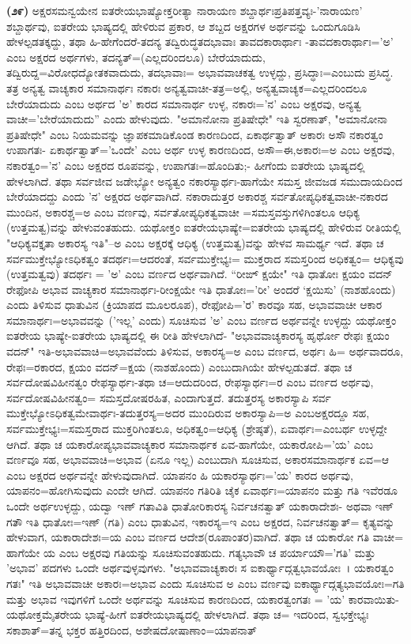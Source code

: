 \textbf{(೨೯)} ಅಕ್ಷರಸಮನ್ವಯೇನ ಐತರೇಯಭಾಷ್ಯೋಕ್ತರೀತ್ಯಾ ನಾರಾಯಣ ಶಬ್ದಾರ್ಥಃ\break ಪ್ರತಿಪತ್ತವ್ಯಃ-'ನಾರಾಯಣ' ಶಬ್ದಾರ್ಥವು, ಐತರೇಯ ಭಾಷ್ಯದಲ್ಲಿ ಹೇಳಿರುವ ಪ್ರಕಾರ, ಆ ಶಬ್ದದ ಅಕ್ಷರಗಳ ಅರ್ಥವನ್ನು ಒಂದುಗೂಡಿಸಿ ಹೇಳಲ್ಪಡತಕ್ಕದ್ದು, ತಥಾ ಹಿ-ಹೇಗೆಂದರೆ-\-ತದನ್ಯ ತದ್ವಿರುದ್ಧತದಭಾವಾಃ ತಾವದಕಾರಾರ್ಥಾಃ -ತಾವದಕಾರಾರ್ಥಾಃ='ಅ' ಎಂಬ ಅಕ್ಷರದ ಅರ್ಥಗಳು, ತದನ್ಯತ್=(ಎಲ್ಲದರಿಂದಲೂ) ಬೇರೆಯಾದುದು, ತದ್ವಿರುದ್ದ=ವಿರೋಧ\-ದ್ಯೋತಕ\-ವಾದುದು, ತದಭಾವಾಃ= ಅಭಾವವಾಚಕತ್ವ ಉಳ್ಳದ್ದು, ಪ್ರಸಿದ್ಧಾಃ=ಎಂಬುದು ಪ್ರಸಿದ್ಧ. ತತ್ರ ಅನ್ಯತ್ವ ವಾಚ್ಯಕಾರ ಸಮಾನಾರ್ಥಃ ನಕಾರಃ ಅನ್ಯತ್ವವಾಚೀ-ತತ್ರ=ಅಲ್ಲಿ, ಅನ್ಯತ್ವ\-ವಾಚ್ಯಕ=\break ಎಲ್ಲದರಿಂದಲೂ ಬೇರೆಯಾದುದು ಎಂಬ ಅರ್ಥದ 'ಅ' ಕಾರದ ಸಮಾನಾರ್ಥ ಉಳ್ಳ, ನಕಾರಃ='ನ' ಎಂಬ ಅಕ್ಷರವು, ಅನ್ಯತ್ವ ವಾಚೀ='ಬೇರೆಯಾದುದು'' ಎಂದು ಹೇಳುವುದು. "ಅಮಾನೋನಾ ಪ್ರತಿಷೇಧೇ" ಇತಿ ಸ್ವರಣಾತ್, "ಅಮಾನೋನಾ ಪ್ರತಿಷೇಧೇ" ಎಂಬ ನಿಯಮವನ್ನು ಜ್ಞಾಪಕಮಾಡಿಕೊಂಡ ಕಾರಣದಿಂದ, ಏಕಾರ್ಥತ್ವಾತ್ ಅಕಾರಃ ಅಸೌ ನಕಾರತ್ವಂ ಉಪಾಗತಃ- ಏಕಾರ್ಥತ್ವಾತ್='ಒಂದೇ' ಎಂಬ ಅರ್ಥ ಉಳ್ಳ ಕಾರಣದಿಂದ, ಅಸೌ=ಈ,\break ಅಕಾರಃ=ಅ ಎಂಬ ಅಕ್ಷರವು, ನಕಾರತ್ವಂ='ನ' ಎಂಬ ಅಕ್ಷರದ ರೂಪವನ್ನು, ಉಪಾಗತಃ=\break ಹೊಂದಿತು;- ಹೀಗೆಂದು ಐತರೇಯ ಭಾಷ್ಯದಲ್ಲಿ ಹೇಳಲಾಗಿದೆ. ತಥಾ ಸರ್ವಜೀವ ಜಡೇಭ್ಯೋ ಅನ್ಯತ್ವಂ ನಕಾರಸ್ಯಾರ್ಥಃ-ಹಾಗೆಯೇ ಸಮಸ್ತ ಜೀವಜಡ ಸಮುದಾಯದಿಂದ ಬೇರೆಯಾದದ್ದು ಎಂದು 'ನ' ಅಕ್ಷರದ ಅರ್ಥವಾಗಿದೆ. ನಕಾರಾದುತ್ತರ ಅಕಾರಶ್ಚ ಸರ್ವತೋಪ್ಯಧಿಕತ್ವವಾಚೀ-ನಕಾರದ ಮುಂದಿನ, ಅಕಾರಶ್ಚ=ಅ ಎಂಬ ವರ್ಣವು, ಸರ್ವತೋಪ್ಯಧಿಕತ್ವವಾಚೀ =ಸಮಸ್ತವಸ್ತುಗಳಿಗಿಂತಲೂ ಆಧಿಕ್ಯ (ಉತ್ತಮತ್ವ)ವನ್ನು ಹೇಳುವಂತಹುದು. ಯಥೋಕ್ತಂ ಐತರೇಯಭಾಷ್ಯೇ=ಐತರೇಯ ಭಾಷ್ಯದಲ್ಲಿ ಹೇಳಿರುವ ರೀತಿಯಲ್ಲಿ "ಆಧಿಕ್ಯವಕ್ತೃತಾ ಅಕಾರಸ್ಯ ಇತಿ"–ಅ ಎಂಬ ಅಕ್ಷರಕ್ಕೆ ಆಧಿಕ್ಯ (ಉತ್ತಮತ್ವ)ವನ್ನು ಹೇಳವ ಸಾಮರ್ಥ್ಯ ಇದೆ. ತಥಾ ಚ ಸರ್ವಮುಕ್ತೇಭ್ಯೋಽಧಿಕತ್ವಂ ತದರ್ಥಃ=ಆದರಂತೆ, ಸರ್ವಮುಕ್ತೇಭ್ಯಃ= ಮುಕ್ತರಾದ ಸಮಸ್ತರಿಂದ ಅಧಿಕತ್ವಂ= ಆಧಿಕ್ಯವು (ಉತ್ತಮತ್ವವು) ತದರ್ಥಃ = 'ಅ' ಎಂಬ ವರ್ಣದ ಅರ್ಥವಾಗಿದೆ. “ರೀಙ್ ಕ್ಷಯೇ" ಇತಿ ಧಾತೋಃ ಕ್ಷಯಂ ವದನ್ ರೇಫೋಪಿ ಅಭಾವ ವಾಚ್ಯಕಾರ ಸಮಾನಾರ್ಥಃ-ರೀಂಕ್ಷಯೇ ಇತಿ ಧಾತೋಃ='ರೀ' ಅಂದರೆ `ಕ್ಷಯಿಸು' (ನಾಶಹೊಂದು) ಎಂದು ತಿಳಿಸುವ ಧಾತುವಿನ (ಕ್ರಿಯಾಪದ ಮೂಲರೂಪ), ರೇಫೋಪಿ='ರ' ಕಾರವೂ ಸಹ, ಅಭಾವವಾಚೀ ಆಕಾರ ಸಮಾನಾರ್ಥಃ=ಅಭಾವವನ್ನು ('ಇಲ್ಲ' ಎಂದು) ಸೂಚಿಸುವ 'ಅ' ಎಂಬ ವರ್ಣದ ಅರ್ಥವನ್ನೇ ಉಳ್ಳದ್ದು ಯಥೋಕ್ತಂ ಐತರೇಯ ಭಾಷ್ಯೇ-ಐತರೇಯ ಭಾಷ್ಯದಲ್ಲಿ ಈ ರೀತಿ ಹೇಳಲಾಗಿದೆ- "ಅಭಾವವಾಚ್ಯಕಾರಸ್ಯ ಹೃರ್ಥೋ ರೇಫಃ ಕ್ಷಯಂ ವದನ್" ಇತಿ-ಅಭಾವವಾಚಿ=ಅಭಾವವೆಂದು ತಿಳಿಸುವ, ಅಕಾರಸ್ಯ=ಅ ಎಂಬ ವರ್ಣದ, ಅರ್ಥಃ ಹಿ= ಅರ್ಥವಾದರೂ, ರೇಫಃ=ರಕಾರದ, ಕ್ಷಯಂ ವದನ್=ಕ್ಷಯ (ನಾಶಹೊಂದು) ಎಂಬುದಾಗಿಯೇ ಹೇಳಲ್ಪಡುತದೆ. ತಥಾ ಚ ಸರ್ವದೋಷವಿಹೀನತ್ವಂ ರೇಫಸ್ಯಾರ್ಥಃ-ತಥಾ ಚ=ಆದುದರಿಂದ, ರೇಫಸ್ಯಾರ್ಥಃ=ರ ಎಂಬ ವರ್ಣದ ಅರ್ಥವು, ಸರ್ವದೋಷವಿಹೀನತ್ವಂ= ಸಮಸ್ತದೋಷರಹಿತ, ಎಂದಾಗುತ್ತದೆ. ತದುತ್ತರಸ್ಯ ಅಕಾರಸ್ಯಾಪಿ ಸರ್ವ ಮುಕ್ತೇ\-ಭ್ಯೋಽಧಿಕತ್ವಮೇವಾರ್ಥಃ-ತದುತ್ತರಸ್ಯ=ಅದರ ಮುಂದಿರುವ ಅಕಾರಸ್ಯಾಪಿ=ಅ ಎಂಬ\break ಅಕ್ಷರದ್ದೂ ಸಹ, ಸರ್ವಮುಕ್ತೇಭ್ಯಃ=ಸಮಸ್ತರಾದ ಮುಕ್ತರಿಗಿಂತಲೂ, ಅಧಿಕತ್ವಂ=ಆಧಿಕ್ಯ (ಶ್ರೇಷ್ಠತೆ), ಏವಾರ್ಥಃ=ಎಂಬರ್ಥ ಉಳ್ಳದ್ದೇ ಆಗಿದೆ. ತಥಾ ಚ ಯಕಾರೋಪ್ಯಭಾವವಾಚ್ಯಕಾರ ಸಮಾನಾರ್ಥಕ ಏವ-ಹಾಗೆಯೇ, ಯಕಾರೋಪಿ='ಯ' ಎಂಬ ವರ್ಣವೂ ಸಹ, ಅಭಾವವಾಚಿ=ಅಭಾವ (ಏನೂ ಇಲ್ಲ) ಎಂಬುದಾಗಿ ಸೂಚಿಸುವ, ಅಕಾರಸಮಾನಾರ್ಥಕ ಏವ=ಆ ಎಂಬ ಅಕ್ಷರದ ಅರ್ಥವನ್ನೇ ಹೇಳುವುದಾಗಿದೆ. ಯಾಪನಂ ಹಿ ಯಕಾರಸ್ಯಾರ್ಥಃ='ಯ' ಕಾರದ ಅರ್ಥವು, ಯಾಪನಂ=ಹೋಗಿಸುವುದು ಎಂದೇ ಆಗಿದೆ. ಯಾಪನಂ ಗತಿರಿತಿ ಚೈಕ ಏವಾರ್ಥಃ=ಯಾಪನಂ ಮತ್ತು ಗತಿ ಇವೆರಡೂ ಒಂದೇ ಅರ್ಥಉಳ್ಳದ್ದು, ಯದ್ವಾ ಇಣ್ ಗತಾವಿತಿ ಧಾತೋರಿಕಾರಸ್ಯ ನಿರ್ವಚನತ್ವಾತ್ ಯಕಾರಾದೇಶಃ- ಅಥವಾ ಇಣ್ ಗತೌ ಇತಿ ಧಾತೋಃ=ಇಣ್ (ಗತಿ) ಎಂಬ ಧಾತುವಿನ, ಇಕಾರಸ್ಯ=ಇ ಎಂಬ ಅಕ್ಷರದ, ನಿರ್ವಚನತ್ವಾತ್= ಕೃತ್ಯವನ್ನು ಹೇಳುವಾಗ, ಯಕಾರಾದೇಶಃ=ಯ ಎಂಬ ವರ್ಣದ ಆದೇಶ(ರೂಪಾಂತರ)ವಾಗಿದೆ. ತಥಾ ಚ ಯಕಾರೋ ಗತಿ ವಾಚೀ= ಹಾಗೆಯೇ ಯ ಎಂಬ ಅಕ್ಷರವು ಗತಿಯನ್ನು ಸೂಚಿಸುವಂತಹುದು. ಗತ್ಯಭಾವೌ ಚ ಪರ್ಯಾಯೌ\break ='ಗತಿ' ಮತ್ತು 'ಅಭಾವ' ಪದಗಳು ಒಂದೇ ಅರ್ಥವುಳ್ಳವುಗಳು. "ಅಭಾವವಾಚ್ಯಕಾರಃ ಸ ಐಕಾರ್ಥ್ಯಾದ್ಗತ್ವಭಾವಯೋಃ~। ಯಕಾರತ್ವಂ ಗತಃ" ಇತಿ ಅಭಾವವಾಚೀ ಅಕಾರಃ=ಅಭಾವ ಎಂದು ಸೂಚಿಸುವ ಅ ಎಂಬ ವರ್ಣವು ಐಕಾರ್ಥ್ಯಾದ್ಗತ್ಯಭಾವಯೋಃ=ಗತಿ ಮತ್ತು ಅಭಾವ ಇವುಗಳಿಗೆ ಒಂದೇ ಅರ್ಥವನ್ನು ಸೂಚಿಸುವ ಕಾರಣದಿಂದ, ಯಕಾರತ್ವಂಗತಃ = 'ಯ' ಕಾರ\-ವಾಯಿತು- ಯಥೋಕ್ತಮೈತರೇಯ ಭಾಷ್ಯೆ-ಹೀಗೆ ಐತರೇಯಭಾಷ್ಯದಲ್ಲಿ ಹೇಳಲಾಗಿದೆ. ತಥಾ ಚ= ಇದರಿಂದ, ಸ್ವಭಕ್ತೇಭ್ಯಃ ಸಕಾಶಾತ್=ತನ್ನ ಭಕ್ತರ ಹತ್ತಿರದಿಂದ, ಅಶೇಷದೋಷಾಣಾಂ\break =ಯಾಪನಾತ್ 